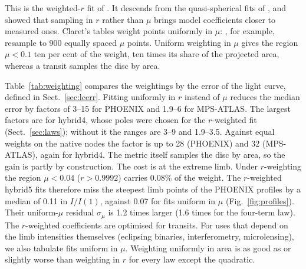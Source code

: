 \documentclass{aa}
\begin{document}
This is the weighted-$r$ fit of \citet{morello2020}. It descends from the
quasi-spherical fits of \citet{claret2012}, and \citet{morello2017} showed that
sampling in $r$ rather than $\mu$ brings model coefficients closer to measured
ones. Claret's tables weight points uniformly in $\mu$:
\citet{claretsouthworth2023}, for example, resample to 900 equally spaced
$\mu$ points. Uniform weighting in $\mu$ gives the region $\mu<0.1$ ten per
cent of the weight, ten times its share of the projected area, whereas a
transit samples the disc by area.

Table~\ref{tab:weighting} compares the weightings by the error of the light
curve, defined in Sect.~\ref{sec:lcerr}. Fitting uniformly in $r$ instead of
$\mu$ reduces the median error by factors of 3--15 for PHOENIX and 1.9--6 for
MPS-ATLAS. The largest factors are for hybrid4, whose poles were chosen for
the $r$-weighted fit (Sect.~\ref{sec:laws}); without it the ranges are 3--9
and 1.9--3.5. Against equal weights on the native nodes the factor is up to
28 (PHOENIX) and 32 (MPS-ATLAS), again for hybrid4.
The metric itself samples the disc by area, so the gain is partly by
construction. The cost is at the extreme limb. Under $r$-weighting the region
$\mu<0.04$ ($r>0.9992$) carries 0.08\% of the weight. The $r$-weighted hybrid5
fits therefore miss the steepest limb points of the PHOENIX profiles by a
median of 0.11 in $I/I(1)$, against 0.07 for fits uniform in $\mu$
(Fig.~\ref{fig:profiles}). Their uniform-$\mu$ residual $\sigma_\mu$ is
1.2 times larger (1.6 times for the four-term law). The $r$-weighted
coefficients are optimised for transits. For uses that depend on the limb
intensities themselves (eclipsing binaries, interferometry, microlensing), we
also tabulate fits uniform in $\mu$. Weighting uniformly in area is as good as
or slightly worse than weighting in $r$ for every law except the quadratic.
\end{document}
